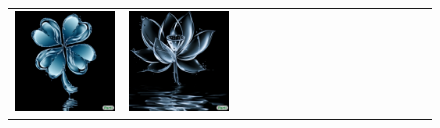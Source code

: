 \begin{figure}[ht!]
\begin{adjustwidth}{-0.8in}{-0.5in}
\begin{tabular}{cccccccccccccccccccc}
\multicolumn{3}{c}{\includegraphics[width=\twobytwocolwidth\textwidth]{figures/cherries/water_clover.jpg}} &
\multicolumn{3}{c}{\includegraphics[width=\twobytwocolwidth\textwidth]{figures/cherries/water_lotus.jpg}} &&

\end{tabular}
\end{adjustwidth}
\end{figure}
